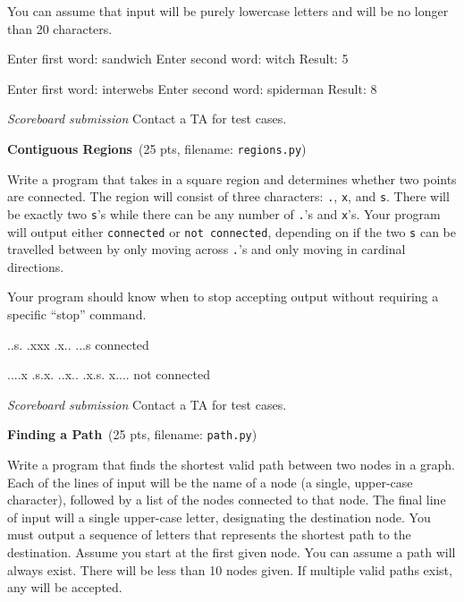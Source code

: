\documentclass[11pt]{cselabheader}
\newcommand{\cop}[3]{\textbf{#1}~(#2 pts, filename: \texttt{#3})\quad}
\theoremstyle{plain}
\begin{document}
\begin{enumerate}
    You can assume that input will be purely lowercase letters and will be
    no longer than 20 characters.

    \begin{verbatimcode}
Enter first word: sandwich
Enter second word: witch
Result: 5
    \end{verbatimcode}

    \begin{verbatimcode}
Enter first word: interwebs
Enter second word: spiderman
Result: 8
    \end{verbatimcode}

    \textit{Scoreboard submission} Contact a TA for test cases.


  \item \cop{Contiguous Regions}{25}{regions.py}
    
    Write a program that takes in a square region and determines whether two
    points are connected. The region will consist of three characters: \texttt{.},
    \texttt{x}, and \texttt{s}. There will be exactly two \texttt{s}'s while there
    can be any number of \texttt{.}'s and \texttt{x}'s. Your program will output
    either \texttt{connected} or \texttt{not connected}, depending on if the two
    \texttt{s} can be travelled between by only moving across \texttt{.}'s and only
    moving in cardinal directions.

    Your program should know when to stop accepting output without requiring a specific
    ``stop'' command.

    \begin{verbatimcode}
..s.
.xxx
.x..
...s
connected
    \end{verbatimcode}

    \begin{verbatimcode}
....x
.s.x.
..x..
.x.s.
x....
not connected
    \end{verbatimcode}

    \textit{Scoreboard submission} Contact a TA for test cases.

    

  \item \cop{Finding a Path}{25}{path.py}
    
    Write a program that finds the shortest valid path between two nodes in a graph.
    Each of the lines of input will be the name of a node (a single, upper-case
    character), followed by a list of the nodes connected to that node. The final
    line of input will a single upper-case letter, designating the destination node.
    You must output a sequence of letters that represents the shortest path to the
    destination. Assume you start at the first given node. You can assume a path will
    always exist. There will be less than 10 nodes given. If multiple valid paths
    exist, any will be accepted.
    

\end{enumerate}
\end{document}

